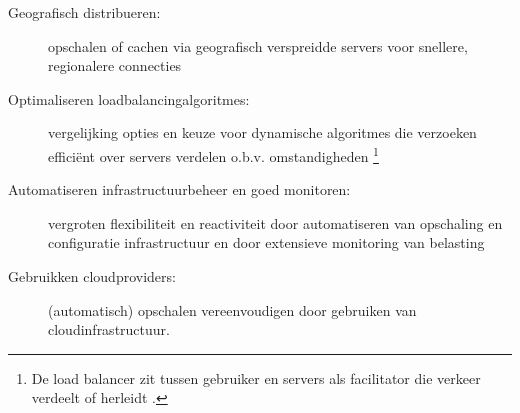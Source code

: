 \begin{description}
    \item [Geografisch distribueren:] opschalen of cachen via
    geografisch verspreidde servers voor snellere, regionalere connecties
    \cite{sivasubramanian2007analysis, chenhao2017mitigating,
    colajanni1998dynamic}
    
    \item [Optimaliseren loadbalancingalgoritmes:] vergelijking opties 
    en keuze voor dynamische algoritmes die verzoeken efficiënt over
    servers verdelen o.b.v. omstandigheden
    \cite{mourad1997scalable, zhou2023comparative, amazon2023whatisload}
    \footnote{De load balancer zit tussen gebruiker en servers als
    facilitator die verkeer verdeelt of herleidt \cite{amazon2023whatisload}.}

    \item [Automatiseren infrastructuurbeheer en goed monitoren:] vergroten
    flexibiliteit en reactiviteit door automatiseren van opschaling en
    configuratie infrastructuur en door extensieve monitoring van belasting
    
    \item [Gebruikken cloudproviders:] (automatisch) opschalen vereenvoudigen
    door gebruiken van cloudinfrastructuur.
\end{description}


